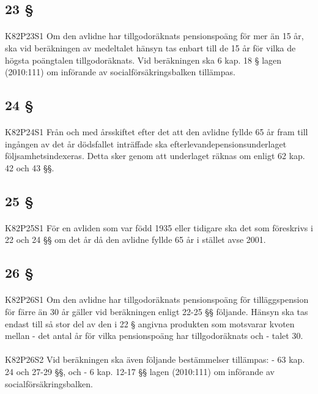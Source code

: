 \documentclass[a4paper,notitlepage,openany,10pt]{book}
\begin{document}
\subsection*{23 §}
\paragraph*{}
{\tiny K82P23S1}
Om den avlidne har tillgodoräknats pensionspoäng för mer än 15 år, ska vid beräkningen av medeltalet hänsyn tas enbart till de 15 år för vilka de högsta poängtalen tillgodoräknats.
Vid beräkningen ska 6 kap. 18 § lagen (2010:111) om införande av socialförsäkringsbalken tillämpas.
\subsection*{24 §}
\paragraph*{}
{\tiny K82P24S1}
Från och med årsskiftet efter det att den avlidne fyllde 65 år fram till ingången av det år dödsfallet inträffade ska efterlevandepensionsunderlaget följsamhetsindexeras. Detta sker genom att underlaget räknas om enligt 62 kap. 42 och 43 §§.
\subsection*{25 §}
\paragraph*{}
{\tiny K82P25S1}
För en avliden som var född 1935 eller tidigare ska det som föreskrivs i 22 och 24 §§ om det år då den avlidne fyllde 65 år i stället avse 2001.
\subsection*{26 §}
\paragraph*{}
{\tiny K82P26S1}
Om den avlidne har tillgodoräknats pensionspoäng för tilläggspension för färre än 30 år gäller vid beräkningen enligt 22-25 §§ följande. Hänsyn ska tas endast till så stor del av den i 22 § angivna produkten som motsvarar kvoten mellan
\newline - det antal år för vilka pensionspoäng har tillgodoräknats och
\newline - talet 30.
\paragraph*{}
{\tiny K82P26S2}
Vid beräkningen ska även följande bestämmelser tillämpas:
\newline - 63 kap. 24 och 27-29 §§, och
\newline - 6 kap. 12-17 §§ lagen (2010:111) om införande av socialförsäkringsbalken.
\end{document}
